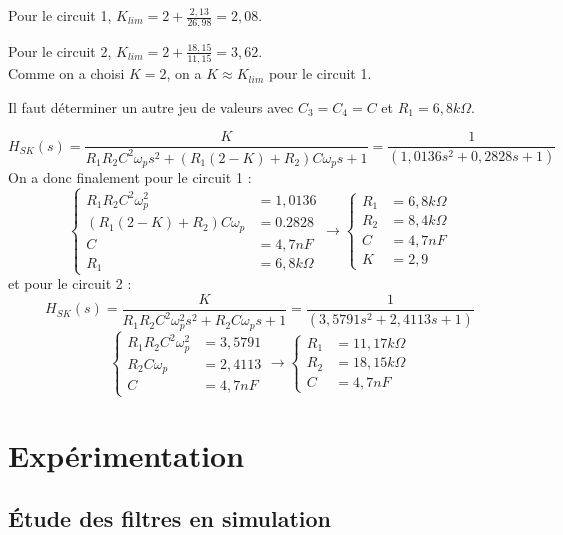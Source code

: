 \documentclass[../../Cours_M1.tex]{subfiles}
\begin{document}
Pour le circuit 1, $K_{lim} = 2 + \frac{2,13}{26,98} = 2,08$.

Pour le circuit 2, $K_{lim} = 2 + \frac{18,15}{11,15} = 3,62$.\\

Comme on a choisi $K=2$, on a $K\approx K_{lim}$ pour le circuit 1.

Il faut déterminer un autre jeu de valeurs avec $C_3=C_4=C$ et $R_1=6,8k\Omega$.

\[H_{SK}(s) = \frac{K}{R_1R_2C^2\omega_ps^2+(R_1(2-K)+R_2)C\omega_ps + 1} = \frac{1}{(1,0136s^2 + 0,2828s +1)}\]
On a donc finalement pour le circuit 1 :
\[
\left\{
\begin{array}{ll}
R_1R_2C^2\omega_p^2 & = 1,0136 \\
(R_1(2-K)+R_2)C\omega_p & = 0.2828 \\
C & = 4,7 nF \\
R_1 & = 6,8k\Omega
\end{array}
\right.
\rightarrow
\left\{
\begin{array}{ll}
R_1 & = 6,8k\Omega \\
R_2 & = 8,4k\Omega \\
C & = 4,7 nF\\
K & = 2,9
\end{array}
\right.
\]
et pour le circuit 2 :
\[H_{SK}(s) = \frac{K}{R_1R_2C^2\omega_p^2s^2+R_2C\omega_ps+1}
=\frac{1}{(3,5791s^2 + 2,4113s +1)}\]
\[
\left\{
\begin{array}{ll}
R_1R_2C^2\omega_p^2 & = 3,5791 \\
R_2C\omega_p & = 2,4113 \\
C & = 4,7 nF
\end{array}
\right.
\rightarrow
\left\{
\begin{array}{ll}
R_1 & = 11,17k\Omega \\
R_2 & = 18,15k\Omega \\
C & = 4,7 nF
\end{array}
\right.
\]

\section*{Expérimentation}
\setcounter{subsection}{0}

\subsection{Étude des filtres en simulation}
\end{document}
